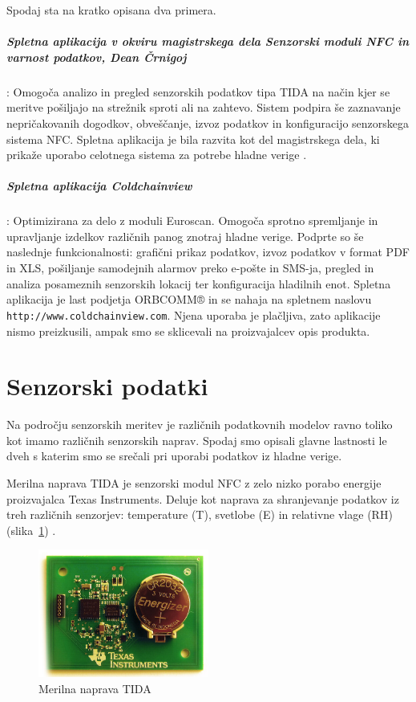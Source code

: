 \documentclass[a4paper, 12pt]{book}
\begin{document}
Spodaj sta na kratko opisana dva primera.


\noindent \subparagraph{\textbf{Spletna aplikacija v okviru magistrskega dela Senzorski moduli NFC in varnost podatkov, Dean Črnigoj}}: 
Omogoča analizo in pregled senzorskih podatkov tipa TIDA na način kjer se meritve pošiljajo na strežnik sproti ali na zahtevo. Sistem podpira še zaznavanje nepričakovanih dogodkov, obveščanje, izvoz podatkov in konfiguracijo senzorskega sistema NFC. Spletna aplikacija je bila razvita kot del magistrskega dela, ki prikaže uporabo celotnega sistema za potrebe hladne verige \cite{magistrska-crnigoj}.


\noindent \subparagraph{\textbf{Spletna aplikacija Coldchainview}}:
Optimizirana za delo z moduli Euroscan. Omogoča sprotno spremljanje in upravljanje izdelkov različnih panog znotraj hladne verige. Podprte so še naslednje funkcionalnosti: grafični prikaz podatkov, izvoz podatkov v format PDF in XLS, pošiljanje samodejnih alarmov preko e-pošte in SMS-ja, pregled in analiza posameznih senzorskih lokacij ter konfiguracija hladilnih enot.
Spletna aplikacija je last podjetja ORBCOMM® in se nahaja na spletnem naslovu \\ \verb=http://www.coldchainview.com=. Njena uporaba je plačljiva, zato aplikacije nismo preizkusili, ampak smo se sklicevali na proizvajalcev opis produkta. \cite{coldchainview}
 
\clearpage

\section{Senzorski podatki}

Na področju senzorskih meritev je različnih podatkovnih modelov ravno toliko kot imamo različnih senzorskih naprav. Spodaj smo opisali glavne lastnosti le dveh s katerim smo se srečali pri uporabi podatkov iz hladne verige.

\vspace{5mm}

Merilna naprava TIDA je senzorski modul NFC z zelo nizko porabo energije proizvajalca Texas Instruments. Deluje kot naprava za shranjevanje podatkov iz treh različnih senzorjev: temperature (T), svetlobe (E) in relativne vlage (RH) (slika~\ref{merilna-naprava-tida}) \cite{magistrska-crnigoj}.

\begin{figure}[h]
\begin{center}
\includegraphics[width=0.5\textwidth]{slike/merilna-naprava-tida.png}
\end{center}
\caption{Merilna naprava TIDA}
\label{merilna-naprava-tida}
\end{figure}
\end{document}
